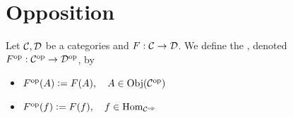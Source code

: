 \documentclass{book}
\begin{document}
	
	
	
	
	
	
	
	
	
	
	
	
	
	
	
	
	
	
	
	
	
	
	
	
	
	
	
	
	
	
	
	
	
	
	
	
	
	
	
	
	
	
	
	
	
	
	
	
	
	
	
	
	
	
	
	
	
	
	
	
	
	
	
	
	
	
	
	
	
	
	
	
	
	
	
	
	
	
	
	
	
	
	
	
	
	\newpage
	\section{Opposition}
	
	
	\begin{defn} 
		Let $\mathcal{C}, \mathcal{D}$ be a categories and $F:\mathcal{C} \rightarrow \mathcal{D}$. We define the , denoted ${F}^{\text{op}}: {\mathcal{C}}^{\text{op}} \rightarrow {\mathcal{D}}^{\text{op}}$, by
		\begin{itemize}
			\item ${F}^{\text{op}}(A) \vcentcolon= F(A), \quad A \in \operatorname{Obj}({\mathcal{C}}^{\text{op}})$
			\item ${F}^{\text{op}}(f) \vcentcolon= F(f), \quad f \in \operatorname{Hom}_{{\mathcal{C}}^{\text{op}}}$
		\end{itemize}
	\end{defn}
	
\end{document}
